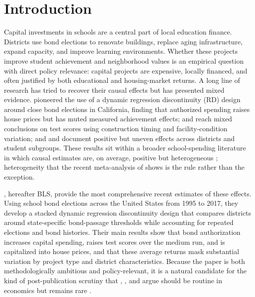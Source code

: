 \documentclass[12pt]{article}
\begin{document}
\doublespacing

\section{Introduction} \label{sec:introduction}

Capital investments in schools are a central part of local education finance. Districts use bond elections to renovate buildings, replace aging infrastructure, expand capacity, and improve learning environments. Whether these projects improve student achievement and neighborhood values is an empirical question with direct policy relevance: capital projects are expensive, locally financed, and often justified by both educational and housing-market returns. A long line of research has tried to recover their causal effects but has presented mixed evidence. \citet{cellini2010value} pioneered the use of a dynamic regression discontinuity (RD) design around close bond elections in California, finding that authorized spending raises house prices but has muted measured achievement effects; \citet{neilson2014effect} and \citet{martorell2016investing} reach mixed conclusions on test scores using construction timing and facility-condition variation; and \citet{hong2016investing} and \citet{rauscher2020delayed} document positive but uneven effects across districts and student subgroups. These results sit within a broader school-spending literature in which causal estimates are, on average, positive but heterogeneous \citep{jackson2016effects,lafortune2018school,baron2022school,abott2020school}; heterogeneity that the recent meta-analysis of \citet{jackson2024impacts} shows is the rule rather than the exception.

\citet{biasi_what_2025}, hereafter BLS, provide the most comprehensive recent estimates of these effects. Using school bond elections across the United States from 1995 to 2017, they develop a stacked dynamic regression discontinuity design that compares districts around state-specific bond-passage thresholds while accounting for repeated elections and bond histories. Their main results show that bond authorization increases capital spending, raises test scores over the medium run, and is capitalized into house prices, and that these average returns mask substantial variation by project type and district characteristics. Because the paper is both methodologically ambitious and policy-relevant, it is a natural candidate for the kind of post-publication scrutiny that \citet{hamermesh2007replication}, \citet{clemens2017meaning}, and \citet{christensen2018transparency} argue should be routine in economics but remains rare \citep{changli2015economics,galiani2017incentives,duvendack2017replication}.
\end{document}
